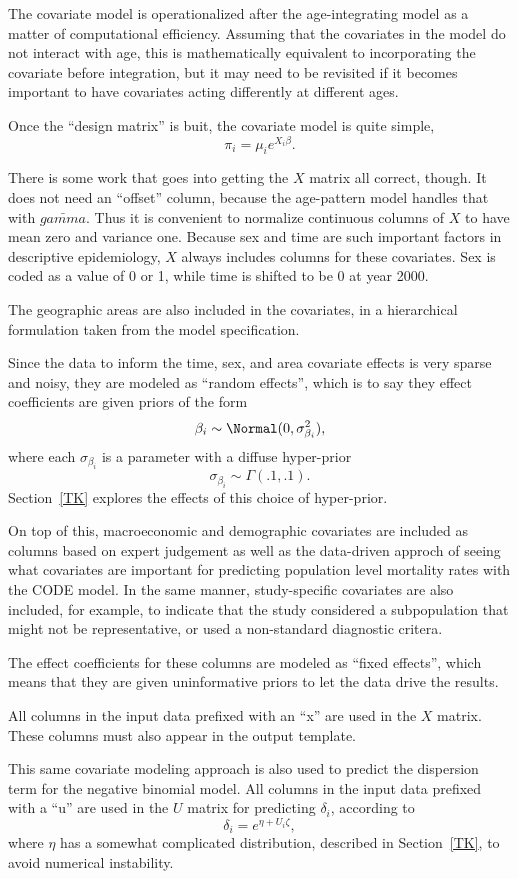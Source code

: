 The covariate model is operationalized after the age-integrating model
as a matter of computational efficiency.  Assuming that the covariates
in the model do not interact with age, this is mathematically
equivalent to incorporating the covariate before integration, but it
may need to be revisited if it becomes important to have covariates
acting differently at different ages.

Once the ``design matrix'' is buit, the covariate model is quite simple,
\[
\pi_i = \mu_i e^{X_i\beta}.
\]

There is some work that goes into getting the $X$ matrix all correct,
though.  It does not need an ``offset'' column, because the
age-pattern model handles that with $\bar{gamma}$.  Thus it is
convenient to normalize continuous columns of $X$ to have mean zero
and variance one.  Because sex and time are such important factors in
descriptive epidemiology, $X$ always includes columns for these
covariates.  Sex is coded as a value of 0 or 1, while time is shifted
to be 0 at year 2000.

The geographic areas are also included in the covariates, in a
hierarchical formulation taken from the model specification.

Since the data to inform the time, sex, and area covariate effects is
very sparse and noisy, they are modeled as ``random effects'', which
is to say they effect coefficients are given priors of the form
\[
\beta_i \sim \Normal(0, \sigma_{\beta_i}^2),
\]
where each $\sigma_{\beta_i}$ is a parameter with a diffuse hyper-prior
\[
\sigma_{\beta_i} \sim \Gamma(.1, .1).
\]
Section~\ref{TK} explores the effects of this choice of hyper-prior.


On top of this, macroeconomic and demographic covariates are included
as columns based on expert judgement as well as the data-driven
approch of seeing what covariates are important for predicting
population level mortality rates with the CODE model. In the same
manner, study-specific covariates are also included, for example, to
indicate that the study considered a subpopulation that might not be
representative, or used a non-standard diagnostic critera.

The effect coefficients for these columns are modeled as ``fixed
effects'', which means that they are given uninformative priors to let
the data drive the results.

All columns in the input data prefixed with an ``x'' are used in the
$X$ matrix.  These columns must also appear in the output template.

This same covariate modeling approach is also used to predict the
dispersion term for the negative binomial model.  All columns in the
input data prefixed with a ``u'' are used in the $U$ matrix for
predicting $\delta_i$, according to
\[
\delta_i = e^{\eta + U_i\zeta},
\]
where $\eta$ has a somewhat complicated distribution, described in
Section~\ref{TK}, to avoid numerical instability.
